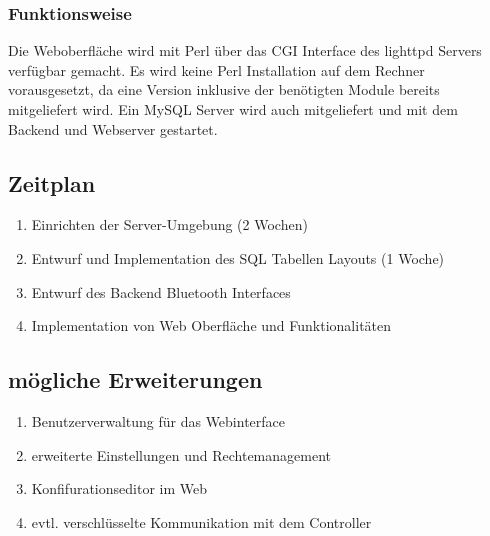 \documentclass[12pt,a4paper]{article}
\begin{document}
\subsubsection{Funktionsweise}

Die Weboberfläche wird mit Perl über das CGI Interface des lighttpd Servers verfügbar gemacht. Es wird keine Perl Installation auf dem Rechner vorausgesetzt, da eine Version inklusive der benötigten Module bereits mitgeliefert wird. Ein MySQL Server wird auch mitgeliefert und mit dem Backend und Webserver gestartet.


\subsection{Zeitplan}

\begin{enumerate}
	\item Einrichten der Server-Umgebung (2 Wochen)
	\item Entwurf und Implementation des SQL Tabellen Layouts (1 Woche)
	\item Entwurf des Backend Bluetooth Interfaces
	\item Implementation von Web Oberfläche und Funktionalitäten
\end{enumerate}

\subsection{mögliche Erweiterungen}

\begin{enumerate}
	\item Benutzerverwaltung für das Webinterface
	\item erweiterte Einstellungen und Rechtemanagement
	\item Konfifurationseditor im Web
	\item evtl. verschlüsselte Kommunikation mit dem Controller
\end{enumerate}
\end{document}
